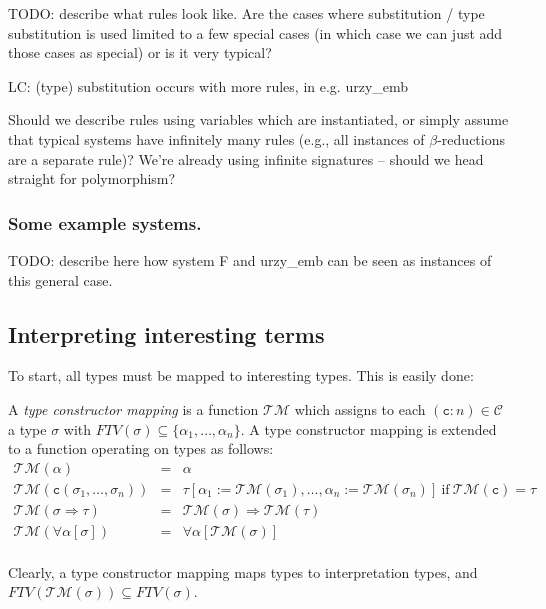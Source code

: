 \documentclass[runningheads,a4paper]{llncs}
\newcommand{\TypeConstructors}{\mathcal{C}}
\newcommand{\Typemap}{\mathcal{T\!M}}
\newcommand{\quant}[2]{\forall #1[#2]}
\newcommand{\arrtype}{\Rightarrow}
\newcommand{\FTV}{\mathit{FTV}}
\newcommand{\con}{\mathtt{c}}
\begin{document}
TODO: describe what rules look like.  Are the cases where substitution
/ type substitution is used limited to a few special cases (in which
case we can just add those cases as special) or is it very typical?

LC: (type) substitution occurs with more rules, in e.g. urzy\_emb

Should we describe rules using variables which are instantiated, or
simply assume that typical systems have infinitely many rules (e.g.,
all instances of $\beta$-reductions are a separate rule)? We're
already using infinite signatures -- should we head straight for
polymorphism?

\subsubsection{Some example systems.}

TODO: describe here how system F and urzy\_emb can be seen as instances
of this general case.

\subsection{Interpreting interesting terms}

To start, all types must be mapped to interesting types.  This is
easily done:

\begin{definition}
A \emph{type constructor mapping} is a function $\Typemap$ which assigns
to each $(\con:n) \in \TypeConstructors$ a type $\sigma$ with
$\FTV(\sigma) \subseteq \{ \alpha_1,\dots,\alpha_n \}$.  A type
constructor mapping is extended to a function operating on types as
follows:
\[
\begin{array}{rcl}
\Typemap(\alpha) & = & \alpha \\
\Typemap(\con(\sigma_1,\dots,\sigma_n)) & = &
  \tau[\alpha_1:=\Typemap(\sigma_1),\dots,\alpha_n:=\Typemap(\sigma_n)]\ 
  \text{if}\ \Typemap(\con) = \tau \\
\Typemap(\sigma \arrtype \tau) & = & \Typemap(\sigma) \arrtype
  \Typemap(\tau) \\
\Typemap(\quant{\alpha}{\sigma}) & = & \quant{\alpha}{\Typemap(\sigma)} \\
\end{array}
\]
\end{definition}

Clearly, a type constructor mapping maps types to interpretation types,
and $\FTV(\Typemap(\sigma)) \subseteq \FTV(\sigma)$.
\end{document}
